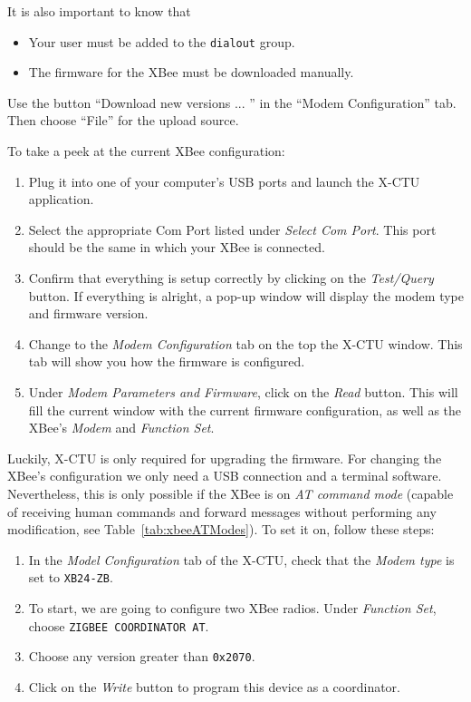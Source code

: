 It is also important to know that

\begin{itemize}
	\item Your user must be added to the \texttt{dialout} group.
	\item The firmware for the XBee must be downloaded manually.
\end{itemize} 

Use the button ``Download new versions ... '' in the ``Modem Configuration'' tab. Then choose ``File'' for the upload source.

To take a peek at the current XBee configuration: 

\begin{enumerate}
	\item Plug it into one of your computer's USB ports and launch the X-CTU application.
	\item Select the appropriate Com Port listed under \emph{Select Com Port}. This port should be the same in which your XBee is connected.
	\item Confirm that everything is setup correctly by clicking on the \emph{Test/Query} button. If everything is alright, a pop-up window will display the modem type and firmware version.
	\item Change to the \emph{Modem Configuration} tab on the top the X-CTU window. This tab will show you how the firmware is configured.
	\item Under \emph{Modem Parameters and Firmware}, click on the \emph{Read} button. This will fill the current window with the current firmware configuration, as well as the XBee's \emph{Modem} and \emph{Function Set}.
\end{enumerate}

Luckily, X-CTU is only required for upgrading the firmware. For changing the XBee's configuration we only need a USB connection and a terminal software. Nevertheless, this is only possible if the XBee is on \emph{AT command mode} (capable of receiving human commands and forward messages without performing any modification, see Table~\ref{tab:xbeeATModes}). To set it on, follow these steps:

\begin{enumerate}
	\item In the \emph{Model Configuration} tab of the X-CTU, check that the \emph{Modem type} is set to \texttt{XB24-ZB}.
	\item To start, we are going to configure two XBee radios. Under \emph{Function Set}, choose \texttt{ZIGBEE COORDINATOR AT}.
	\item Choose any version greater than \texttt{0x2070}.
	\item Click on the \emph{Write} button to program this device as a coordinator.
\end{enumerate}

